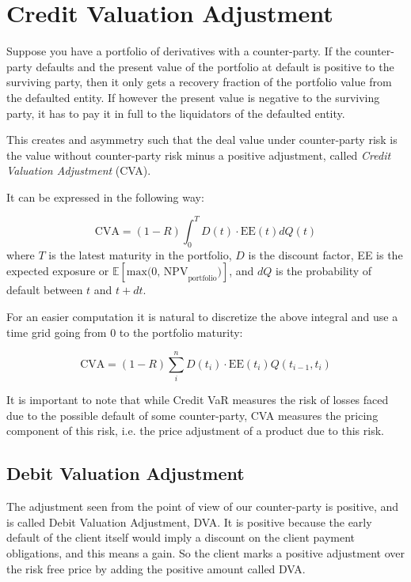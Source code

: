 \section{Credit Valuation Adjustment}
\label{credit-valuation-adjustment}

Suppose you have a portfolio of derivatives with a counter-party. If the counter-party defaults and the present value of the portfolio at default is positive to the surviving party, then it only gets a recovery fraction of the portfolio value from the defaulted entity. If however the present value is negative to the surviving party, it has to pay it in full to the liquidators of the defaulted entity.

This creates and asymmetry such that the deal value under counter-party risk is the value without counter-party risk minus a positive adjustment, called \emph{Credit Valuation Adjustment} (CVA).

It can be expressed in the following way:

\begin{equation}
\text{CVA} = (1-R) \int_0^T D(t) \cdot \textrm{EE}(t) dQ(t)
\label{eq:cva}
\end{equation}
where $T$ is the latest maturity in the portfolio, $D$ is the discount factor, EE is the expected exposure or \(\mathbb{E}[\text{max(0, NPV}_\text{portfolio})]\), and $dQ$ is the probability of default between $t$ and $t+dt$.

For an easier computation it is natural to discretize the above integral and use a time grid going from 0 to the portfolio maturity:

\begin{equation}
\text{CVA} = (1-R) \sum_i^n D(t_i) \cdot \mathrm{EE}(t_i) Q(t_{i-1}, t_i)
\label{eq:cva_discrete}
\end{equation}

It is important to note that while Credit VaR measures the risk of losses faced due to the possible default of some counter-party, CVA measures the pricing component of this risk, i.e. the price adjustment of a product due to this risk.

\subsection{Debit Valuation Adjustment}

The adjustment seen from the point of view of our counter-party is positive, and is called Debit Valuation Adjustment, DVA. It is positive because the early default of the client itself would imply a discount on the client payment obligations, and this means a gain. So the client marks a positive adjustment over the risk free price by adding the positive amount called DVA. 

